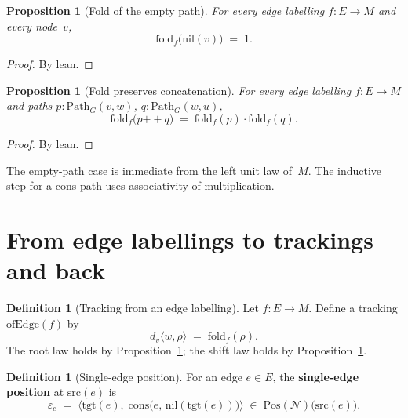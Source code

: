 \documentclass[11pt,a4paper]{article}
\theoremstyle{plain}
\newtheorem{proposition}[theorem]{Proposition}
\theoremstyle{definition}
\newtheorem{definition}[theorem]{Definition}
\newcommand{\Pos}{\mathrm{Pos}}
\newcommand{\src}{\mathrm{src}}
\newcommand{\tgt}{\mathrm{tgt}}
\begin{document}
\begin{proposition}[Fold of the empty path]\label{prop:fold-nil}
For every edge labelling $f : E \to M$ and every node~$v$,
\[
  \mathrm{fold}_f\bigl(\mathrm{nil}(v)\bigr) \;=\; 1.
\]
\end{proposition}

\begin{proof}
By lean.
\end{proof}

\begin{proposition}[Fold preserves concatenation]\label{prop:fold-append}
For every edge labelling $f : E \to M$ and paths
$p : \mathrm{Path}_G(v,w)$, $q : \mathrm{Path}_G(w,u)$,
\[
  \mathrm{fold}_f\bigl(p \mathbin{{+}{+}} q\bigr)
  \;=\;
  \mathrm{fold}_f(p) \cdot \mathrm{fold}_f(q).
\]
\end{proposition}

\begin{proof}
By lean.
\end{proof}

The empty-path case is immediate from the left unit law of~$M$. The inductive
step for a cons-path uses associativity of multiplication.

\section{From edge labellings to trackings and back}

\begin{definition}[Tracking from an edge labelling]\label{def:of-edge}
Let $f : E \to M$. Define a tracking $\mathrm{ofEdge}(f)$ by
\begin{equation}
  d_v\bigl\langle w,\rho \bigr\rangle
  \;=\;
  \mathrm{fold}_f(\rho).
\end{equation}
The root law holds by Proposition~\ref{prop:fold-nil}; the shift law holds by
Proposition~\ref{prop:fold-append}.
\end{definition}

\begin{definition}[Single-edge position]\label{def:single-edge}
For an edge $e \in E$, the \textbf{single-edge position} at $\src(e)$ is
\begin{equation}
  \varepsilon_e
  \;=\;
  \bigl\langle
    \tgt(e),\;
    \mathrm{cons}\bigl(e,\, \mathrm{nil}(\tgt(e))\bigr)
  \bigr\rangle
  \;\in\;
  \Pos(\mathcal{N})\bigl(\src(e)\bigr).
\end{equation}
\end{definition}
\end{document}
